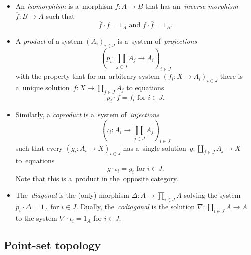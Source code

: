 \begin{itemize}
\item An \emph{isomorphism} is a~morphism $f\colon A \to B$ that has
an~\emph{inverse morphism\/} $\overline{f}\colon B \to A$ such that
\[
  \overline{f} \cdot f = 1_A \text{ and } f \cdot \overline{f} = 1_B.
\]
\end{itemize}

\begin{itemize}
\item A \emph{product} of a system $\left(A_i\right)_{i\in J}$ is a~system
of~\emph{projections\/}
\[
  \left(p_i\colon \prod_{j\in J} A_j \to A_i \right)_{i\in J}
\]
with the property that for an~arbitrary system $\left(f_i\colon X \to
A_i\right)_{i\in J}$ there is a~unique solution~$f\colon X \to \prod_{j\in
J} A_j$ to equations
\[
  p_i \cdot f = f_i \text{ for } i\in J.
\]

\item Similarly, a \emph{coproduct} is a~system of~\emph{injections\/}
\[
  \left(\iota_i\colon A_i \to \coprod_{j\in J} A_j \right)_{i\in J}
\]
such that every $\left(g_i\colon A_i \to X \right)_{i\in J}$ has a~single
solution~$g\colon \coprod_{j\in J} A_j \to X$ to~equations
\[
  g \cdot \iota_i = g_i \text{ for } i\in J.
\]
Note that this is a~product in the~opposite category.

\item The~\emph{diagonal} is the (only) morphism $\Delta\colon A \to \prod_{i\in
J} A$ solving the system $p_i\cdot \Delta = 1_A$ for $i \in J$.
Dually, the~\emph{codiagonal} is the solution $\nabla\colon \coprod_{i\in J} A
\to A$ to the system $\nabla\cdot \iota_i = 1_A$ for $i \in J$.
\end{itemize}


\subsection*{Point-set topology}

